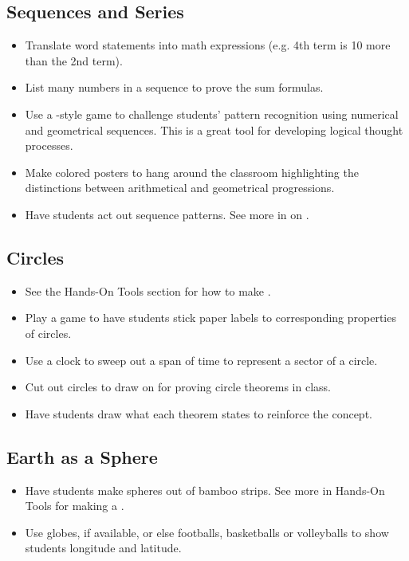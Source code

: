 	\subsection{Sequences and Series}
	\begin{itemize}
	\item Translate word statements into math expressions (e.g. 4th term is 10 more than the 2nd term).
	\item List many numbers in a sequence to prove the sum formulas.
	\item Use a -style game to challenge students' pattern recognition using numerical and geometrical sequences. This is a great tool for developing logical thought processes.
	\item Make colored posters to hang around the classroom highlighting the distinctions between arithmetical and geometrical progressions.
	\item Have students act out sequence patterns. See more in  on .
	\end{itemize}

	\subsection{Circles} \label{circlesactivities}
	\begin{itemize}
	\item See the Hands-On Tools section for how to make .
	\item Play a game to have students stick paper labels to corresponding properties of circles.
	\item Use a clock to sweep out a span of time to represent a sector of a circle.
	\item Cut out circles to draw on for proving circle theorems in class.
	\item Have students draw what each theorem states to reinforce the concept.
	\end{itemize}

	\subsection{Earth as a Sphere}
	\begin{itemize}
	\item Have students make spheres out of bamboo strips. See more in Hands-On Tools for making a .
	\item Use globes, if available, or else footballs, basketballs or volleyballs to show students longitude and latitude.
	\end{itemize}

